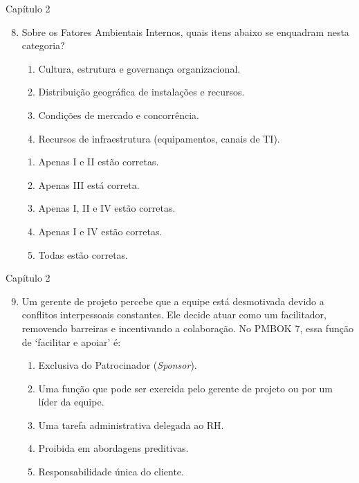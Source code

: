 \documentclass{beamer}
\begin{document}
\begin{frame}{Capítulo 2}
	\begin{enumerate}
		\setcounter{enumi}{7}
		\justifying
		\item Sobre os Fatores Ambientais Internos, quais itens abaixo se enquadram nesta categoria?
		
		\begin{enumerate}[I]
			\item Cultura, estrutura e governança organizacional.
			\item Distribuição geográfica de instalações e recursos.
			\item Condições de mercado e concorrência.
			\item Recursos de infraestrutura (equipamentos, canais de TI).
		\end{enumerate}
		
		\vspace{10pt}
		\begin{enumerate}[a]
			\item Apenas I e II estão corretas.
			\item Apenas III está correta.
			\item \alert<2>{Apenas I, II e IV estão corretas}.
			\item Apenas I e IV estão corretas.
			\item Todas estão corretas.
		\end{enumerate}
	\end{enumerate}
\end{frame}

\begin{frame}{Capítulo 2}
	\begin{enumerate}
		\setcounter{enumi}{8}
		\justifying
		\item Um gerente de projeto percebe que a equipe está desmotivada devido a conflitos interpessoais constantes. Ele decide atuar como um facilitador, removendo barreiras e incentivando a colaboração. No PMBOK 7, essa função de `facilitar e apoiar' é:
		\begin{enumerate}[a]
			\justifying
			\item Exclusiva do Patrocinador (\textit{Sponsor}).
			\item \alert<2>{Uma função que pode ser exercida pelo gerente de projeto ou por um líder da equipe}.
			\item Uma tarefa administrativa delegada ao RH.
			\item Proibida em abordagens preditivas.
			\item Responsabilidade única do cliente.
		\end{enumerate}
	\end{enumerate}
\end{frame}
\end{document}
